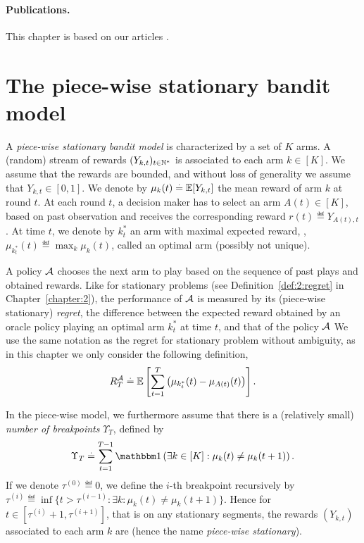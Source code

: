 \paragraph{Publications.}
%
This chapter is based on our articles \cite{Besson2019GLRT,Besson2019Gretsi}.


\section{The piece-wise stationary bandit model}
\label{sec:6:BanditSetting}

A \emph{piece-wise stationary bandit model} is characterized by a set of $K$ arms.
A (random) stream of rewards $(Y_{k,t})_{t\in\mathbb{N}^*}$ is associated to each arm $k \in [K]$. We assume that the rewards are bounded, and without loss of generality we assume that $Y_{k,t} \in [0,1]$.
We denote by $\mu_k(t) \overset{.}{=}  \mathbb{E}[Y_{k,t}]$ the mean reward of arm $k$ at round $t$. At each round $t$, a decision maker has to select an arm $A(t)\in[K]$, based on past observation and receives the corresponding reward $r(t) \eqdef Y_{A(t),t}$.
At time $t$, we denote by $k_t^*$ an arm with maximal expected reward, \ie, $\mu_{k_t^*}(t) \eqdef \max_k \mu_k(t)$, called an optimal arm (possibly not unique).

A policy $\mathcal{A}$ chooses the next arm to play based on the sequence of past plays and obtained rewards.
Like for stationary problems (see Definition~\ref{def:2:regret} in Chapter~\ref{chapter:2}), the performance of $\mathcal{A}$ is measured by its (piece-wise stationary) \emph{regret}, the difference between the expected reward obtained by an oracle policy playing an optimal arm $k_t^*$ at time $t$, and that of the policy $\mathcal{A}$
We use the same notation as the regret for stationary problem without ambiguity, as in this chapter we only consider the following definition,
%
\begin{equation}\label{def:6:regret}
    R_T^{\mathcal{A}} \overset{.}{=} \mathbb{E}\left[\sum_{t=1}^T \left(\mu_{k_t^*}(t) - \mu_{A(t)}(t)\right)\right].
\end{equation}


In the piece-wise \iid{} model, we furthermore assume that there is a (relatively small) \emph{number of breakpoints} $\Upsilon_T$, defined by
\begin{equation}\label{def:6:breakpoints}
    \Upsilon_T \eqdef \sum_{t=1}^{T-1} \indic\left(\exists k\in[K]: \mu_k(t) \neq \mu_k(t+1)\right).
\end{equation}
If we denote $\tau^{(0)} \eqdef 0$, we define the $i$-th breakpoint recursively by
$\tau^{(i)} \eqdef \inf\{t > \tau^{(i-1)} : \exists k : \mu_k(t) \neq \mu_k(t+1)\}$.
%
Hence for $t\in[\tau^{(i)} + 1,\tau^{(i+1)}]$, that is on any stationary segments, the rewards $(Y_{k,t})$ associated to each arm $k$ are \iid{} (hence the name \emph{piece-wise stationary}).

